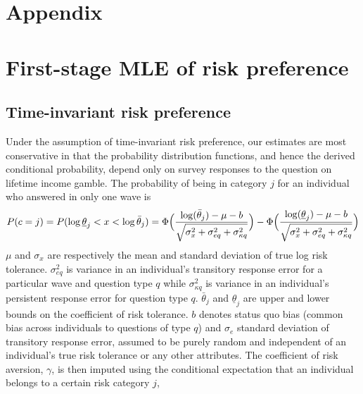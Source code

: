 \documentclass[emulatestandardclasses, 10pt, abstract = true]{scrartcl}
\begin{document}
\pagebreak





\pagebreak

\section*{Appendix}
\appendix

\setcounter{secnumdepth}{3}

\section{First-stage MLE of risk preference}
\subsection{Time-invariant risk preference}
Under the assumption of time-invariant risk preference, our estimates are most conservative in that the probability distribution functions, and hence the derived conditional probability, depend only on survey responses to the question on lifetime income gamble. The probability of being in category $j$ for an individual who answered in only one wave is 
\parskip 0cm
\begin{equation}
P(c=j)=P(\log\underline{\theta}_j<x<\log\bar{\theta}_j)=\Phi\Big({\log(\bar{\theta}_j)-\mu-b\over\sqrt{\sigma_x^2+\sigma_{eq}^2+\sigma_{\kappa q}^2}}\Big)-\Phi\Big({\log(\underline{\theta}_j)-\mu-b\over\sqrt{\sigma_x^2+\sigma_{eq}^2+\sigma_{\kappa q}^2}}\Big) 
\label{eq:A-likelihood-constant-univariate}	
\end{equation}
$\mu$ and $\sigma_x$ are respectively the mean and standard deviation of true log risk tolerance. $\sigma_{eq}^2$ is variance in an individual's transitory response error for a particular wave and question type $q$ while $\sigma_{\kappa q}^2$ is variance in an individual's persistent response error for question type $q$. $\bar \theta_j$ and $\underline{\theta}_j$ are upper and lower bounds on the coefficient of risk tolerance. $b$ denotes status quo bias (common bias across individuals to questions of type $q$) and $\sigma_e$ standard deviation of transitory response error, assumed to be purely random and independent of an individual's true risk tolerance or any other attributes. The coefficient of risk aversion, $\gamma$, is then imputed using the conditional expectation that an individual belongs to a certain risk category $j$,
\end{document}
